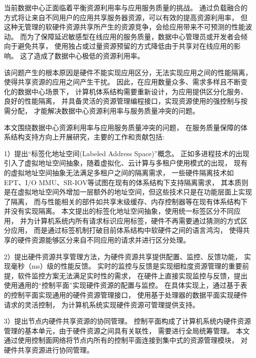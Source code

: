 \begin{cabstract}
  当前数据中心正面临着平衡资源利用率与应用服务质量的挑战。
  通过负载融合的方式将让来自不同用户的应用共享服务器资源，可以有效的提高资源利用率，
  但这种无管理的软硬件资源共享所产生的资源竞争，会给应用带来不可预测的性能波动。
  而为了保障延迟敏感型在线应用的服务质量，数据中心管理员或开发者会倾向于避免共享，
  使用独占或过量资源预留的方式降低由于共享对在线应用的影响。
  这了造成了数据中心极低的资源利用率。

  该问题产生的根本原因是硬件不能实现应用区分，无法实现应用之间的性能隔离，
  使得共享资源的应用之间产生干扰。
  因此，在应用数量众多、需求多样且不断变化的数据中心场景下，
  计算机体系结构需要重新设计，为应用提供区分化服务、良好的性能隔离，
  并具备灵活的资源管理编程接口，实现资源使用的强控制与按需分配，
  才能解决数据中心资源利用率与服务质量冲突的问题。

  本文围绕数据中心资源利用率与应用服务质量冲突的问题，
  在服务质量保障的体系结构支持方向上开展研究，主要的工作和贡献包括:

  1）提出``标签化地址空间(Labeled Address Space)''概念。
     正如多进程技术的出现引入了虚拟地址空间抽象，随着虚拟化、云计算与多租户使用模式的出现，
     现有的虚拟地址空间抽象无法满足多租户之间的隔离需求，
     一些硬件隔离技术如EPT、I/O MMU、SR-IOV等试图在现有的体系结构下支持隔离需求，
     其本质则是在虚拟地址空间外增加一层额外的地址空间，但这些技术只是在功能层面上实现了隔离，
     而与性能相关的部件如共享末级缓存、内存控制器等在现有体系结构下并没有实现隔离。
     本文提出的标签化地址空间抽象，使用统一标签区分不同应用，
     并为计算机系统内所有请求标识应用标签，硬件不再需要通过猜测的方式区分应用，
     而是通过标签机制打破目前体系结构中软硬件之间的语言鸿沟，
     使得共享的硬件资源能够区分来自不同应用的请求并进行区分处理。

  2）提出硬件资源共享管理方法，为硬件资源共享提供配置、监控、反馈功能，
     实现毫秒（ms）级的性能反馈。
     实时的监控与反馈是实现细粒度资源管理的重要前提，软件监控方案无法满足实时性的需求，
     在硬件上直接实现监控与反馈，提出使用通用的``控制平面''实现硬件资源的配置与监控。
     在具体实现上，通过基于表的控制平面实现通用的硬件资源管理接口，
     使用基于处理器的数据平面实现硬件请求的灵活控制，
     为计算机系统实现硬件资源可管理提供支持。

  3）提出节点内硬件共享资源的协同管理。
     控制平面构成了计算机系统内硬件资源管理的基本单元，由于硬件资源之间具有关联性，
     需要进行全局统筹管理。
     本文通过使用控制面网络将节点内所有的控制平面连接到集中式的资源管理模块，
     对硬件共享资源进行协同管理。
\end{cabstract}

